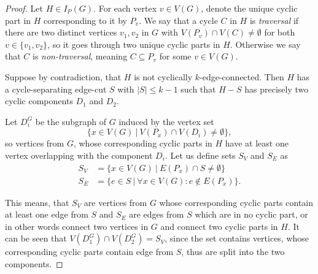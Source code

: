 \documentclass[12pt, twoside]{book}
\begin{document}
\begin{proof}
	Let $H\in I_P(G)$. For each vertex $v\in V(G)$, denote the unique cyclic part in $H$ corresponding to it by $P_v$. We say that a cycle $C$ in $H$ is \textit{traversal} if there are two distinct vertices $v_1,v_2$ in $G$ with $V(P_v)\cap V(C)\neq \emptyset$ for both $v\in\{v_1,v_2\}$, so it goes through two unique cyclic parts in $H$. Otherwise we say that $C$ is \textit{non-traversal}, meaning $C\subseteq P_v$ for some $v\in V(G)$.
	
	Suppose by contradiction, that $H$ is not cyclically $k$-edge-connected. Then $H$ has a cycle-separating edge-cut $S$ with $|S|\leq k-1$ such that $H-S$ has precisely two cyclic components $D_1$ and $D_2$.
	
	Let $D_i^G$ be the subgraph of $G$ induced by the vertex set $$\{x\in V(G)~|~ V(P_x)\cap V(D_i)\neq \emptyset\},$$ so vertices from $G$, whose corresponding cyclic parts in $H$ have at least one vertex overlapping with the component $D_i$. Let us define sets $S_V$ and $S_E$ as
	\begin{align*}
		S_V &= \{x\in V(G) ~|~ E(P_x)\cap S\neq \emptyset\} \\
		S_E &= \{e\in S ~|~ \forall x\in V(G): e\notin E(P_x) \}.
	\end{align*}
	
	This means, that $S_V$ are vertices from $G$ whose corresponding cyclic parts contain at least one edge from $S$ and $S_E$ are edges from $S$ which are in no cyclic part, or in other words connect two vertices in $G$ and connect two cyclic parts in $H$. It can be seen that ${V(D_1^G)\cap V(D_2^G)=S_V}$, since the set contains vertices, whose corresponding cyclic parts contain edge from $S$, thus are split into the two components.
	

\end{proof}
\end{document}
